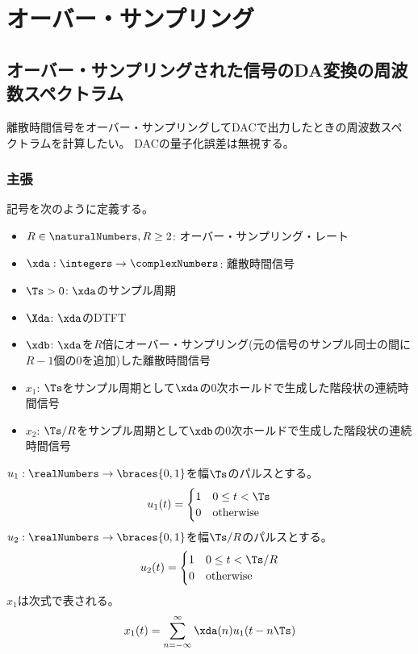 \chapter{オーバー・サンプリング}
    \section{オーバー・サンプリングされた信号のDA変換の周波数スペクトラム}
        離散時間信号をオーバー・サンプリングしてDACで出力したときの周波数スペクトラムを計算したい。
        DACの量子化誤差は無視する。
        \subsection{主張}
            記号を次のように定義する。
            \begin{itemize}
                \item $R\in\naturalNumbers,R\geq 2$: オーバー・サンプリング・レート
                \item $\xda:\integers\to\complexNumbers$: 離散時間信号
                \item $\Ts>0$: $\xda$のサンプル周期
                \item $\Xda$: $\xda$のDTFT
                \item $\xdb$: $\xda$を$R$倍にオーバー・サンプリング(元の信号のサンプル同士の間に$R-1$個の0を追加)した離散時間信号
                \item $x_1$: $\Ts$をサンプル周期として$\xda$の0次ホールドで生成した階段状の連続時間信号
                \item $x_2$: $\Ts/R$をサンプル周期として$\xdb$の0次ホールドで生成した階段状の連続時間信号
            \end{itemize}
            $u_1:\realNumbers\to\braces{0,1}$を幅$\Ts$のパルスとする。
            \[
                u_1(t) = \begin{cases}
                    1 & 0\leq t < \Ts \\
                    0 & \text{otherwise}
                \end{cases}
            \]
            $u_2:\realNumbers\to\braces{0,1}$を幅$\Ts/R$のパルスとする。
            \[
                u_2(t) = \begin{cases}
                    1 & 0\leq t < \Ts/R \\
                    0 & \text{otherwise}
                \end{cases}
            \]
            $x_1$は次式で表される。
            \[ x_1(t) = \sum_{n=-\infty}^\infty \xda(n)u_1(t-n\Ts) \]
